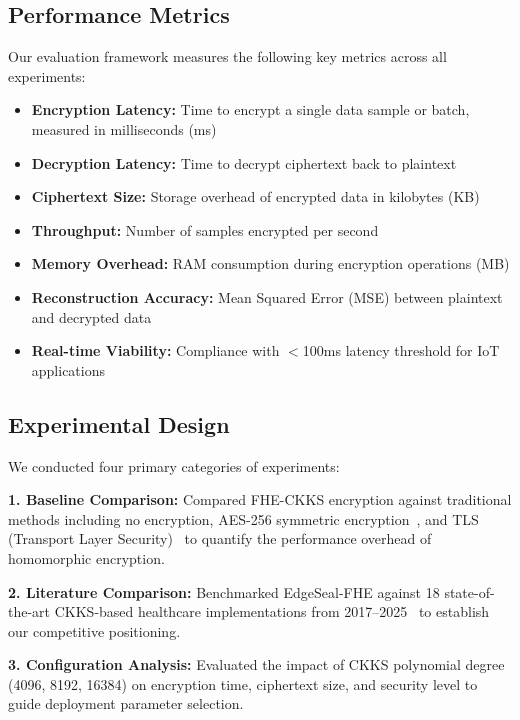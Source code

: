 \documentclass[review]{elsarticle}
\begin{document}
\subsection{Performance Metrics}

Our evaluation framework measures the following key metrics across all experiments:

\begin{itemize}
    \item \textbf{Encryption Latency:} Time to encrypt a single data sample or batch, measured in milliseconds (ms)
    \item \textbf{Decryption Latency:} Time to decrypt ciphertext back to plaintext
    \item \textbf{Ciphertext Size:} Storage overhead of encrypted data in kilobytes (KB)
    \item \textbf{Throughput:} Number of samples encrypted per second
    \item \textbf{Memory Overhead:} RAM consumption during encryption operations (MB)
    \item \textbf{Reconstruction Accuracy:} Mean Squared Error (MSE) between plaintext and decrypted data
    \item \textbf{Real-time Viability:} Compliance with $<$100ms latency threshold for IoT applications~\cite{bonomi2012fog}
\end{itemize}

\subsection{Experimental Design}

We conducted four primary categories of experiments:

\textbf{1. Baseline Comparison:} Compared FHE-CKKS encryption against traditional methods including no encryption, AES-256 symmetric encryption~\cite{daemen2002design}, and TLS (Transport Layer Security)~\cite{rescorla2018transport} to quantify the performance overhead of homomorphic encryption.

\textbf{2. Literature Comparison:} Benchmarked EdgeSeal-FHE against 18 state-of-the-art CKKS-based healthcare implementations from 2017--2025~\cite{kim2018logistic, benaissa2021tenseal, lee2022efficient, cheon2017homomorphic} to establish our competitive positioning.

\textbf{3. Configuration Analysis:} Evaluated the impact of CKKS polynomial degree (4096, 8192, 16384) on encryption time, ciphertext size, and security level to guide deployment parameter selection.
\end{document}
